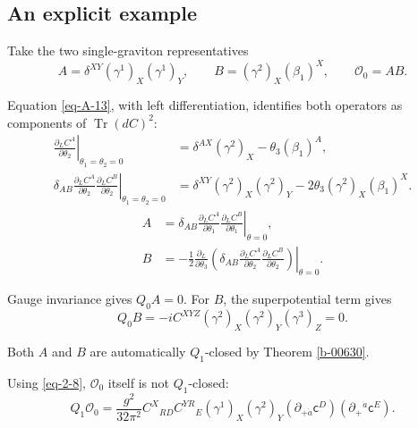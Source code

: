 \documentclass[11pt]{article}
\numberwithin{equation}{section}
\numberwithin{figure}{section}
\numberwithin{table}{section}
\begin{document}
\subsection{An explicit example}\label{sec-graviton-example}

Take the two single-graviton representatives
\begin{equation}\label{eq-gravitoninputs}
A=\delta^{XY}(\gamma^1)_X(\gamma^1)_Y,
\qquad B=(\gamma^2)_X(\beta_1)^X,
\qquad\mathcal O_0=AB.
\end{equation}

Equation \eqref{eq-A-13}, with left differentiation, identifies both operators as components of $\operatorname{Tr}(dC)^2$:
\begin{equation}\label{local-ch8-graviton-component-expansion}
\begin{aligned}
\left.\frac{\partial_L C^A}{\partial\theta_2}\right|_{\theta_1=\theta_2=0}
&=\delta^{AX}(\gamma^2)_X-\theta_3(\beta_1)^A,\\
\left.\delta_{AB}\frac{\partial_L C^A}{\partial\theta_2}
\frac{\partial_L C^B}{\partial\theta_2}\right|_{\theta_1=\theta_2=0}
&=\delta^{XY}(\gamma^2)_X(\gamma^2)_Y-2\theta_3(\gamma^2)_X(\beta_1)^X.
\end{aligned}
\end{equation}
\begin{equation}\label{local-ch8-graviton-component-extraction}
\begin{aligned}
A&=\left.\delta_{AB}\frac{\partial_L C^A}{\partial\theta_1}
\frac{\partial_L C^B}{\partial\theta_1}\right|_{\theta=0},\\
B&=-\frac12\left.\frac{\partial_L}{\partial\theta_3}
\left(\delta_{AB}\frac{\partial_L C^A}{\partial\theta_2}
\frac{\partial_L C^B}{\partial\theta_2}\right)\right|_{\theta=0}.
\end{aligned}
\end{equation}

Gauge invariance gives $Q_0A=0$. For $B$, the superpotential term gives
\begin{equation}\label{b-00658}
Q_0B=-iC^{XYZ}(\gamma^2)_X(\gamma^2)_Y(\gamma^3)_Z=0.
\end{equation}

Both $A$ and $B$ are automatically $Q_1$-closed by Theorem \ref{b-00630}.

Using \eqref{eq-2-8}, $\mathcal O_0$ itself is not $Q_1$-closed:
\begin{equation}\label{eq-scalarfermionQ1}
Q_1\mathcal O_0
=\frac{g^2}{32\pi^2}
C^X{}_{RD}C^{YR}{}_E
(\gamma^1)_X(\gamma^2)_Y
(\partial_{+\dot a}\mathsf c^D)(\partial_+{}^{\dot a}\mathsf c^E).
\end{equation}
\end{document}
